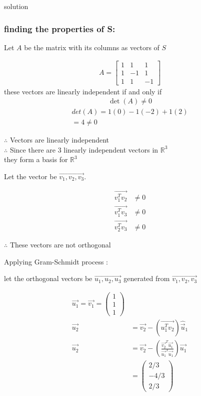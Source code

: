 \documentclass{beamer}
\begin{document}
\begin{frame}{solution}
    \frametitle{finding the properties of S:}
Let $A$ be the matrix with its columns as vectors of $S$

\begin{align}
A = \begin{bmatrix}1 & 1 & 1 \\1 & -1 & 1 \\1 & 1 & -1\end{bmatrix}
\end{align}
these vectors are linearly independent if and only if
\begin{align}
\det(A) \neq 0
\end{align}
\begin{align}
    det(A)=1(0)-1(-2)+1(2)\\
    =4 \neq 0
\end{align}
\end{frame}
\begin{frame}
$\therefore$ Vectors are linearly independent\\
$\therefore$ Since there are 3 linearly independent vectors in $\mathbb{R}^3$ \\
they form a basis for $\mathbb{R}^3$
    
    Let the vector be $\vec{v_1, v_2, v_3}$.
    
    \begin{align}
    \vec{v_1^T v_2} &\neq 0 \\
    \vec{v_1^T v_3 }&\neq 0 \\
    \vec{v_2^T v_3 }&\neq 0
    \end{align}
    \end{frame}
    \begin{frame}
    $\therefore$ These vectors are not orthogonal
    
    Applying Gram-Schmidt process :
    
    let the orthogonal vectors be $\vec{u_1, u_2, u_3}$ generated from $\vec{v_1, v_2, v_3}$
    
    \begin{align}\vec{u_1} = \vec{v_1} = \begin{pmatrix} 1 \\ 1\\1 \end{pmatrix}\\
\vec{u_2} &= \vec{v_2} - (\vec{u_1^T v_2}) \hat{\vec{u}}_1 \\
\vec{u_2} &= \vec{v_2} - \left(\frac{\vec{v_2}^T \vec{u_1}}{\vec{u_1}^T \vec{u_1}} \right) \vec{u_1}\\ &= \begin{pmatrix} 2/3 \\ -4/3 \\ 2/3 \end{pmatrix} 
\end{align}
\end{frame}
\end{document}
